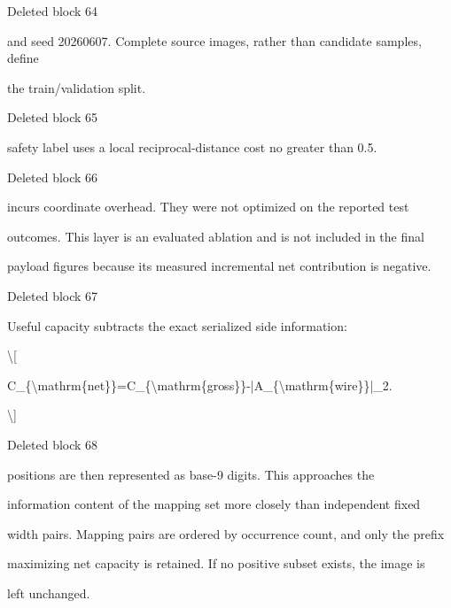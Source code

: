 \documentclass[a4paper,fleqn]{cas-dc}
\newenvironment{RevisionDeletion}{%
  \par\begingroup\color{revisionred}\footnotesize\ttfamily
  \setlength{\parindent}{0pt}\setlength{\parskip}{1pt}\obeyspaces
}{\par\endgroup}
\begin{document}
\begin{RevisionDeletion}
Deleted block 64\par
and seed 20260607. Complete source images, rather than candidate samples, define\par
the train/validation split.\par
\end{RevisionDeletion}

\begin{RevisionDeletion}
Deleted block 65\par
safety label uses a local reciprocal-distance cost no greater than 0.5.\par
\end{RevisionDeletion}

\begin{RevisionDeletion}
Deleted block 66\par
incurs coordinate overhead. They were not optimized on the reported test\par
outcomes. This layer is an evaluated ablation and is not included in the final\par
payload figures because its measured incremental net contribution is negative.\par
\end{RevisionDeletion}

\begin{RevisionDeletion}
Deleted block 67\par
Useful capacity subtracts the exact serialized side information:\par
\textbackslash{}[\par
C\_\{\textbackslash{}mathrm\{net\}\}=C\_\{\textbackslash{}mathrm\{gross\}\}-|A\_\{\textbackslash{}mathrm\{wire\}\}|\_2.\par
\textbackslash{}]\par
\end{RevisionDeletion}

\begin{RevisionDeletion}
Deleted block 68\par
positions are then represented as base-9 digits. This approaches the\par
information content of the mapping set more closely than independent fixed\par
width pairs. Mapping pairs are ordered by occurrence count, and only the prefix\par
maximizing net capacity is retained. If no positive subset exists, the image is\par
left unchanged.\par
\end{RevisionDeletion}
\end{document}
